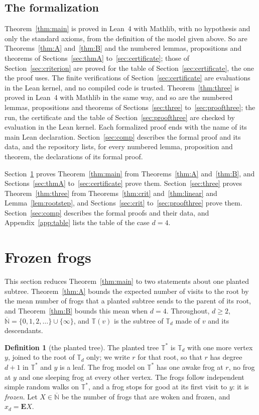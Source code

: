 \documentclass[11pt]{amsart}
\theoremstyle{definition}
\newtheorem{definition}[theorem]{Definition}
\numberwithin{equation}{section}
\newcommand{\T}{\mathbb{T}}
\newcommand{\Ts}{\mathbb{T}^{*}}
\newcommand{\Nb}{\overline{\mathbb{N}}}
\newcommand{\E}{\mathbf{E}}
\begin{document}
\subsection*{The formalization}
Theorem~\ref{thm:main} is proved in Lean~4 with Mathlib, with no hypothesis and only the standard axioms, from the definition of the model given above. So are Theorems~\ref{thm:A} and~\ref{thm:B} and the numbered lemmas, propositions and theorems of Sections~\ref{sec:thmA} to~\ref{sec:certificate}; those of Section~\ref{sec:criterion} are proved for the table of Section~\ref{sec:certificate}, the one the proof uses. The finite verifications of Section~\ref{sec:certificate} are evaluations in the Lean kernel, and no compiled code is trusted. Theorem~\ref{thm:three} is proved in Lean~4 with Mathlib in the same way, and so are the numbered lemmas, propositions and theorems of Sections~\ref{sec:three} to~\ref{sec:proofthree}; the run, the certificate and the table of Section~\ref{sec:proofthree} are checked by evaluation in the Lean kernel. Each formalized proof ends with the name of its main Lean declaration. Section~\ref{sec:comp} describes the formal proof and its data, and the repository lists, for every numbered lemma, proposition and theorem, the declarations of its formal proof.

Section~\ref{sec:reduction} proves Theorem~\ref{thm:main} from Theorems~\ref{thm:A} and~\ref{thm:B}, and Sections~\ref{sec:thmA} to~\ref{sec:certificate} prove them. Section~\ref{sec:three} proves Theorem~\ref{thm:three} from Theorems~\ref{thm:crit} and~\ref{thm:linear} and Lemma~\ref{lem:rootstep}, and Sections~\ref{sec:crit} to~\ref{sec:proofthree} prove them. Section~\ref{sec:comp} describes the formal proofs and their data, and Appendix~\ref{app:table} lists the table of the case $d=4$.

\section{Frozen frogs}\label{sec:reduction}

This section reduces Theorem~\ref{thm:main} to two statements about one planted subtree. Theorem~\ref{thm:A} bounds the expected number of visits to the root by the mean number of frogs that a planted subtree sends to the parent of its root, and Theorem~\ref{thm:B} bounds this mean when $d=4$. Throughout, $d\ge2$, $\Nb=\{0,1,2,\dots\}\cup\{\infty\}$, and $\T(v)$ is the subtree of $\T_d$ made of $v$ and its descendants.

\begin{definition}[the planted tree]\label{def:planted}
The planted tree $\Ts$ is $\T_d$ with one more vertex $y$, joined to the root of $\T_d$ only; we write $r$ for that root, so that $r$ has degree $d+1$ in $\Ts$ and $y$ is a leaf. The frog model on $\Ts$ has one awake frog at $r$, no frog at $y$ and one sleeping frog at every other vertex. The frogs follow independent simple random walks on $\Ts$, and a frog stops for good at its first visit to $y$: it is \emph{frozen}. Let $X\in\Nb$ be the number of frogs that are woken and frozen, and $x_d=\E X$.
\end{definition}
\end{document}
